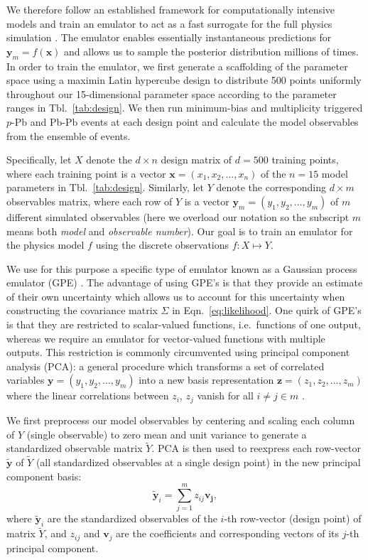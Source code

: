 \documentclass[aps,prc,reprint,amsmath,nofootinbib]{revtex4-1}
\newcommand{\x}{\mathbf{x}}
\newcommand{\y}{\mathbf{y}}
\newcommand{\z}{\mathbf{z}}
\begin{document}
We therefore follow an established framework for computationally intensive models and train an emulator to act as a fast surrogate for the full physics simulation \cite{OHagan:2006ba, Higdon:2008cmc, Higdon:2014tva}.
The emulator enables essentially instantaneous predictions for $\y_m = f(\x)$ and allows us to sample the posterior distribution millions of times.
In order to train the emulator, we first generate a scaffolding of the parameter space using a maximin Latin hypercube design \cite{Morris:1995lh} to distribute 500 points uniformly throughout our 15-dimensional parameter space according to the parameter ranges in Tbl.~\ref{tab:design}.
We then run minimum-bias and multiplicity triggered $p$-Pb and Pb-Pb events at each design point and calculate the model observables from the ensemble of events.

Specifically, let $X$ denote the ${d \times n}$ design matrix of $d=500$ training points, where each training point is a vector $\x = (x_1, x_2, \dots, x_n)$ of the $n=15$ model parameters in Tbl.~\ref{tab:design}.
Similarly, let $Y$ denote the corresponding ${d \times m}$ observables matrix, where each row of $Y$ is a vector $\y_m = (y_1, y_2, \dots, y_m)$ of $m$ different simulated observables (here we overload our notation so the subscript $m$ means both \emph{model} and \emph{observable number}).
Our goal is to train an emulator for the physics model $f$ using the discrete observations $f: X \mapsto Y$.

We use for this purpose a specific type of emulator known as a Gaussian process emulator (GPE) \cite{Rasmussen:2006gp}.
The advantage of using GPE's is that they provide an estimate of their own uncertainty which allows us to account for this uncertainty when constructing the covariance matrix $\Sigma$ in Eqn.~\eqref{eq:likelihood}.
One quirk of GPE's is that they are restricted to scalar-valued functions, i.e.\ functions of one output, whereas we require an emulator for vector-valued functions with multiple outputs.
This restriction is commonly circumvented using principal component analysis (PCA): a general procedure which transforms a set of correlated variables $\y = (y_1, y_2, \dots, y_m)$ into a new basis representation $\z = (z_1, z_2, \dots, z_m)$ where the linear correlations between $z_i$, $z_j$ vanish for all $i\ne j \in m$ \cite{Tipping:1999}.

We first preprocess our model observables by centering and scaling each column of $Y$ (single observable) to zero mean and unit variance to generate a standardized observable matrix $\tilde{Y}$.
PCA is then used to reexpress each row-vector $\tilde{\y}$ of $\tilde{Y}$ (all standardized observables at a single design point) in the new principal component basis:
\begin{equation}
  \tilde{\y}_i = \sum\limits_{j=1}^m z_{ij} \mathbf{v_j},
\end{equation}
where $\tilde{\y}_i$ are the standardized observables of the $i$-th row-vector (design point) of matrix $\tilde{Y}$, and $z_{ij}$ and $\mathbf{v}_j$ are the coefficients and corresponding vectors of its $j$-th principal component.
\end{document}
